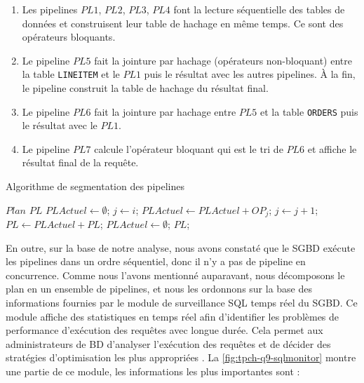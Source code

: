 \begin{enumerate}
 \item Les pipelines $PL1$, $PL2$, $PL3$, $PL4$ font la lecture séquentielle des tables de données et construisent leur table de hachage en même temps. Ce sont des opérateurs bloquants.
 \item Le pipeline $PL5$ fait la jointure par hachage (opérateurs non-bloquant) entre la table \texttt{LINEITEM} et le $PL1$ puis le résultat avec les autres pipelines. À la fin, le pipeline construit la table de hachage du résultat final.
 \item Le pipeline $PL6$ fait la jointure par hachage entre $PL5$ et la table \texttt{ORDERS} puis le résultat avec le $PL1$.
 \item Le pipeline $PL7$ calcule l'opérateur bloquant qui est le tri de $PL6$ et affiche le résultat final de la requête.
\end{enumerate}

\begin{algorithm}
\caption{Algorithme de segmentation des pipelines}
\label{algo:pl-segmentation-algo}
\begin{algorithmic}[1]
\Require  $Plan$ 
\Ensure $PL$ 
\State $PLActuel \leftarrow \emptyset$;
        \State $j \leftarrow i$;
			\State $PLActuel \leftarrow PLActuel + OP_j$;
			\State $j \leftarrow j+1$;
		\EndWhile
		\State $PL \leftarrow PLActuel + PL$;
		\State $PLActuel \leftarrow \emptyset$;
	\EndIf
\EndFor
\State
\Return $PL$;
\end{algorithmic}
\end{algorithm}

En outre, sur la base de notre analyse, nous avons constaté que le SGBD exécute les pipelines dans un ordre séquentiel, donc il n'y a pas de pipeline en concurrence.
Comme nous l'avons mentionné auparavant, nous décomposons le plan en un ensemble de pipelines, et nous les ordonnons sur la base des informations fournies par le module de surveillance SQL temps réel du SGBD. Ce module affiche des statistiques en temps réel afin d'identifier les problèmes de performance d'exécution des requêtes avec longue durée. Cela permet aux administrateurs de BD d'analyser l'exécution des requêtes et de décider des stratégies d'optimisation les plus appropriées \cite{Sergey09}. La \ref{fig:tpch-q9-sqlmonitor} montre une partie de ce module, les informations les plus importantes sont :

